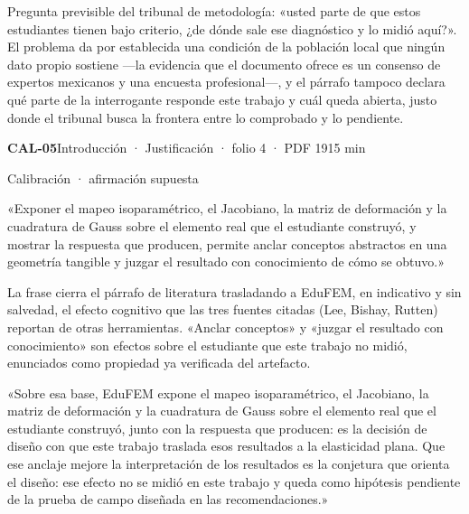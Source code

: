 {\small\color{gris}Pregunta previsible del tribunal de metodología: «usted parte de que estos estudiantes tienen bajo criterio, ¿de dónde sale ese diagnóstico y lo midió aquí?». El problema da por establecida una condición de la población local que ningún dato propio sostiene —la evidencia que el documento ofrece es un consenso de expertos mexicanos y una encuesta profesional—, y el párrafo tampoco declara qué parte de la interrogante responde este trabajo y cuál queda abierta, justo donde el tribunal busca la frontera entre lo comprobado y lo pendiente.\par}
\vspace{6pt}
\noindent\casilla\textbf{CAL-05}\quad{}\quad Introducción · Justificación · folio 4 · PDF 19\hfill 15 min\par\vspace{1pt}
{\small\color{gris}Calibración · afirmación supuesta}\par
\begin{dice}«Exponer el mapeo isoparamétrico, el Jacobiano, la matriz de deformación y la cuadratura de Gauss sobre el elemento real que el estudiante construyó, y mostrar la respuesta que producen, permite anclar conceptos abstractos en una geometría tangible y juzgar el resultado con conocimiento de cómo se obtuvo.»\end{dice}
{\small{}La frase cierra el párrafo de literatura trasladando a EduFEM, en indicativo y sin salvedad, el efecto cognitivo que las tres fuentes citadas (Lee, Bishay, Rutten) reportan de otras herramientas. «Anclar conceptos» y «juzgar el resultado con conocimiento» son efectos sobre el estudiante que este trabajo no midió, enunciados como propiedad ya verificada del artefacto.\par}
\begin{debedecir}«Sobre esa base, EduFEM expone el mapeo isoparamétrico, el Jacobiano, la matriz de deformación y la cuadratura de Gauss sobre el elemento real que el estudiante construyó, junto con la respuesta que producen: es la decisión de diseño con que este trabajo traslada esos resultados a la elasticidad plana. Que ese anclaje mejore la interpretación de los resultados es la conjetura que orienta el diseño: ese efecto no se midió en este trabajo y queda como hipótesis pendiente de la prueba de campo diseñada en las recomendaciones.»\end{debedecir}
\vspace{6pt}
